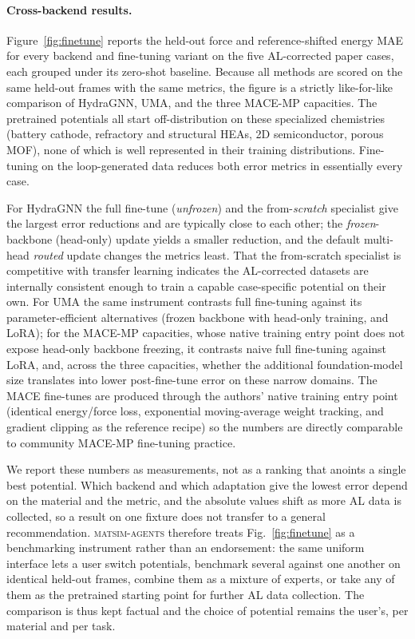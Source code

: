 \documentclass[conference]{IEEEtran}
\def\acs#1{#1}%
\begin{document}
\paragraph{Cross-backend results.}
Figure~\ref{fig:finetune} reports the held-out force and reference-shifted energy
\acs{MAE} for every backend and fine-tuning variant on the five
\acs{AL}-corrected paper cases, each grouped under its zero-shot
baseline. Because all methods are scored on the same held-out frames with the
same metrics, the figure is a strictly like-for-like comparison of HydraGNN, UMA,
and the three MACE-MP capacities. The pretrained potentials all start
off-distribution on these specialized chemistries (battery cathode, refractory
and structural \acsp{HEA}, 2D semiconductor, porous \acs{MOF}), none of which is
well represented in their training distributions. Fine-tuning on the
loop-generated data reduces both error metrics in essentially every case.

For HydraGNN the full fine-tune (\emph{unfrozen}) and the
from-\emph{scratch} specialist give the largest error reductions and are
typically close to each other; the \emph{frozen}-backbone (head-only) update
yields a smaller reduction, and the default multi-head \emph{routed} update
changes the metrics least. That the from-scratch specialist is competitive with
transfer learning indicates the \acs{AL}-corrected datasets are internally
consistent enough to train a capable case-specific potential on their own. For
UMA the same instrument contrasts full fine-tuning against
its parameter-efficient alternatives (frozen backbone with head-only training,
and LoRA); for the MACE-MP capacities, whose native training entry point does
not expose head-only backbone freezing, it contrasts naive full fine-tuning
against LoRA, and, across the three capacities, whether the additional
foundation-model size translates into lower post-fine-tune error on these narrow
domains. The MACE fine-tunes are produced through the authors'
native training entry point (identical energy/force loss, exponential
moving-average weight tracking, and gradient clipping as the reference recipe)
so the numbers are directly
comparable to community MACE-MP fine-tuning practice.

We report these numbers as measurements, not as a ranking that anoints a single
best potential. Which backend and which adaptation give the lowest error depend
on the material and the metric, and the absolute values shift as more
\acs{AL} data is collected, so a result on one fixture does not transfer
to a general recommendation. \textsc{matsim-agents} therefore treats
Fig.~\ref{fig:finetune} as a benchmarking instrument rather than an
endorsement: the same uniform interface lets a user switch potentials, benchmark
several against one another on identical held-out frames, combine them as a
mixture of experts, or take any of them as the pretrained starting point for
further \acs{AL} data collection. The comparison is thus kept factual and
the choice of potential remains the user's, per material and per task.
\end{document}
